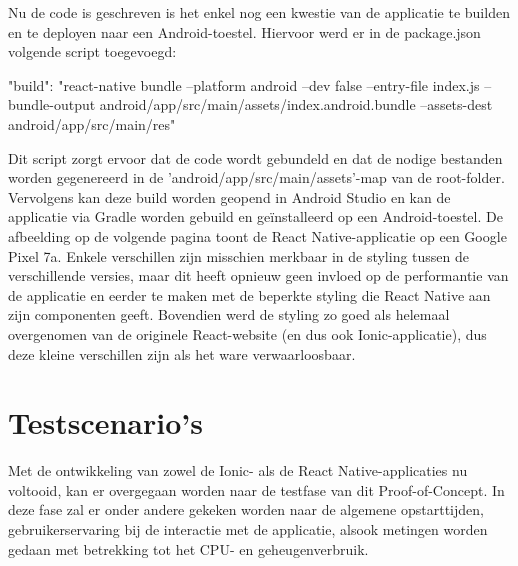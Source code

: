
Nu de code is geschreven is het enkel nog een kwestie van de applicatie te builden en te deployen naar een Android-toestel. Hiervoor werd er in de package.json volgende script toegevoegd:

\begin{LVerbatim}[language=JavaScript, caption=Express API-endpoint voor het streamen van videobestanden]
"build": "react-native bundle --platform android
    --dev false --entry-file index.js
    --bundle-output android/app/src/main/assets/index.android.bundle
    --assets-dest android/app/src/main/res"
\end{LVerbatim}


Dit script zorgt ervoor dat de code wordt gebundeld en dat de nodige bestanden worden gegenereerd in de 'android/app/src/main/assets'-map van de root-folder. Vervolgens kan deze build worden geopend in Android Studio en kan de applicatie via Gradle worden gebuild en geïnstalleerd op een Android-toestel. De afbeelding op de volgende pagina toont de React Native-applicatie op een Google Pixel 7a. Enkele verschillen zijn misschien merkbaar in de styling tussen de verschillende versies, maar dit heeft opnieuw geen invloed op de performantie van de applicatie en eerder te maken met de beperkte styling die React Native aan zijn componenten geeft. Bovendien werd de styling zo goed als helemaal overgenomen van de originele React-website (en dus ook Ionic-applicatie), dus deze kleine verschillen zijn als het ware verwaarloosbaar.

\section{Testscenario's}
\label{sec:testscenario}

Met de ontwikkeling van zowel de Ionic- als de React Native-applicaties nu voltooid, kan er overgegaan worden naar de testfase van dit Proof-of-Concept. In deze fase zal er onder andere gekeken worden naar de algemene opstarttijden, gebruikerservaring bij de interactie met de applicatie, alsook metingen worden gedaan met betrekking tot het CPU- en geheugenverbruik.


